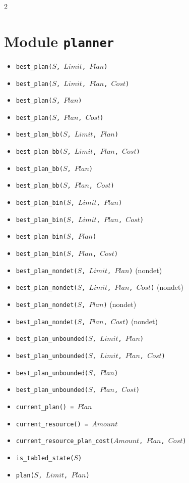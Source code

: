 \documentclass[10pt]{article}
\begin{document}
\begin{multicols}{2}
\section*{Module \texttt{planner}}  
\begin{scriptsize}
\begin{itemize}
\item \texttt{best\_plan($S$, $Limit$, $Plan$)}
\item \texttt{best\_plan($S$, $Limit$, $Plan$, $Cost$)}
\item \texttt{best\_plan($S$, $Plan$)}
\item \texttt{best\_plan($S$, $Plan$, $Cost$)}
\item \texttt{best\_plan\_bb($S$, $Limit$, $Plan$)}
\item \texttt{best\_plan\_bb($S$, $Limit$, $Plan$, $Cost$)}
\item \texttt{best\_plan\_bb($S$, $Plan$)}
\item \texttt{best\_plan\_bb($S$, $Plan$, $Cost$)}
\item \texttt{best\_plan\_bin($S$, $Limit$, $Plan$)}
\item \texttt{best\_plan\_bin($S$, $Limit$, $Plan$, $Cost$)}
\item \texttt{best\_plan\_bin($S$, $Plan$)}
\item \texttt{best\_plan\_bin($S$, $Plan$, $Cost$)}
\item \texttt{best\_plan\_nondet($S$, $Limit$, $Plan$)} (nondet)
\item \texttt{best\_plan\_nondet($S$, $Limit$, $Plan$, $Cost$)} (nondet)
\item \texttt{best\_plan\_nondet($S$, $Plan$)} (nondet)
\item \texttt{best\_plan\_nondet($S$, $Plan$, $Cost$)} (nondet)
\item \texttt{best\_plan\_unbounded($S$, $Limit$, $Plan$)}
\item \texttt{best\_plan\_unbounded($S$, $Limit$, $Plan$, $Cost$)}
\item \texttt{best\_plan\_unbounded($S$, $Plan$)}
\item \texttt{best\_plan\_unbounded($S$, $Plan$, $Cost$)}
\item \texttt{current\_plan() = $Plan$}
\item \texttt{current\_resource() = $Amount$}
\item \texttt{current\_resource\_plan\_cost($Amount$, $Plan$, $Cost$)}
\item \texttt{is\_tabled\_state($S$)}
\item \texttt{plan($S$, $Limit$, $Plan$)}

\end{itemize}
\end{scriptsize}
\end{multicols}
\end{document}
